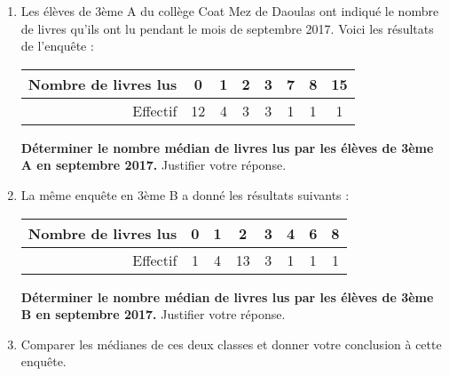 \begin{minipage}{0.99\linewidth}

\exo



\begin{enumerate}

\item Les élèves de 3ème A du collège Coat Mez de Daoulas ont indiqué le nombre de livres qu'ils ont lu pendant le mois de septembre 2017. Voici les résultats de l'enquête :
\begin{center}
 
\begin{tabular}{|r|c|c|c|c|c|c|c|}
\hline 
Nombre de livres lus & 0 & 1 & 2 & 3 & 7 & 8 & 15 \\ 
\hline 
Effectif & 12 & 4 & 3 & 3 & 1 & 1 & 1 \\ 
\hline 
\end{tabular}
 \end{center} 

\textbf{Déterminer le nombre médian de livres lus par les élèves de 3ème A en septembre 2017.} Justifier votre réponse.

\item La même enquête en 3ème B a donné les résultats suivants :

\begin{center}
\begin{tabular}{|r|c|c|c|c|c|c|c|}
\hline 
Nombre de livres lus & 0 & 1 & 2 & 3 & 4 & 6 & 8 \\ 
\hline 
Effectif & 1 & 4 & 13 & 3 & 1 & 1 & 1 \\ 
\hline
\end{tabular} 
\end{center}

\textbf{Déterminer le nombre médian de livres lus par les élèves de 3ème B en septembre 2017.} Justifier votre réponse.



\item Comparer les médianes de ces deux classes et donner votre conclusion à cette enquête.


\end{enumerate}








\end{minipage}

\vspace{0.5cm}
